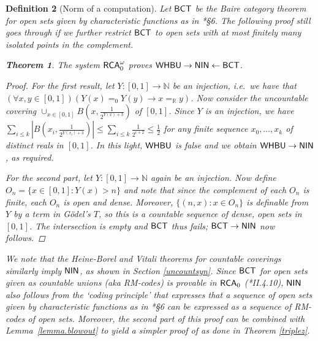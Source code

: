 \documentclass[reqno]{amsart}
\newtheorem{thm}{Theorem}
\newtheorem{defi}[thm]{Definition}
\def\RCA{\textup{\textsf{RCA}}}
\def\RCAo{\textup{\textsf{RCA}}_{0}^{\omega}}
\def\N{{\mathbb  N}}
\def\R{{\mathbb  R}}
\def\di{\rightarrow}
\def\NIN{\textup{\textsf{NIN}}}
\def\BCT{\textup{\textsf{BCT}}}
\def\WHBU{\textup{\textsf{WHBU}}}
\numberwithin{equation}{section}
\numberwithin{thm}{section}
\begin{document}
\begin{defi}[Norm of a computation]
\smallskip

Let $\BCT$ be the Baire category theorem for open sets given by characteristic functions as in \cite{dagsamVII}*{\S6}.
The following proof still goes through if we further restrict $\BCT$ to open sets with at most finitely many isolated points in the complement.  
\begin{thm}\label{flahu}
The system $\RCAo$ proves  $\WHBU\di \NIN\leftarrow \BCT$.  
\end{thm}
\begin{proof}
For the first result, let $Y:[0,1]\di \N$ be an injection, i.e.\ we have that $(\forall x, y\in [0,1])(Y(x)=_{0}Y(y)\di x=_{\R} y)$.  
Now consider the uncountable covering $\cup_{x\in [0,1]}B(x, \frac{1}{2^{Y(x)+3}})$ of $[0,1]$.  
Since $Y$ is an injection, we have $\sum_{i\leq k}|B(x_{i}, \frac{1}{2^{Y(x_{i})+3}})|\leq \sum_{i\leq k} \frac{1}{2^{i+2}} \leq \frac{1}{2}$ for any finite sequence $x_{0}, \dots, x_{k}$ of distinct reals in $[0,1]$.    
In this light, $\WHBU$ is false and we obtain $\WHBU\di \textsf{NIN}$, as required. 

\smallskip

For the second part, let $Y:[0,1]\di \N$ again be an injection.  %
Now define $O_n = \{x\in [0,1] : Y(x) > n\}$ and note that since the complement of each $O_n$ is finite, each $O_n$ is open and dense. Moreover, $\{(n,x) : x \in O_n\}$ is definable from $Y$ by a term in G\"odel's $T$, so this is a countable sequence of dense, open sets in $[0,1]$. The intersection is empty and $\BCT$ thus fails; $\BCT\di \NIN$ now follows. 
\end{proof}
We note that the Heine-Borel and Vitali theorems for \emph{countable} coverings similarly imply $\NIN$, as shown in Section \ref{uncountsyn}.
Since $\BCT$ for open sets given as countable unions (aka RM-codes) is provable in $\RCA_{0}$ (\cite{simpson2}*{II.4.10}), $\NIN$ also follows from 
the `coding principle' that expresses that a sequence of open sets given by characteristic functions as in \cite{dagsamVII}*{\S6} can be expressed as a sequence of RM-codes of open sets.  
Moreover, the second part of this proof can be combined with Lemma~\ref{lemma.blowout} to yield a simpler proof of \cite[Theorem~6.6]{dagsamVII} as done in Theorem \ref{triplez}. 

\smallskip


\end{defi}
\end{document}
